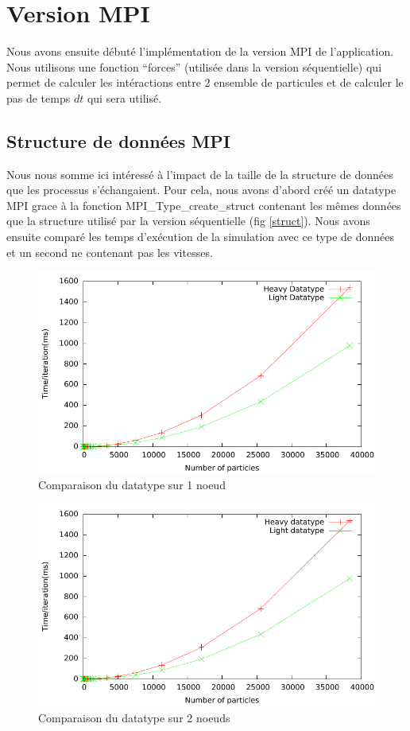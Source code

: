 \documentclass{article}
\begin{document}
\section{Version MPI}
Nous avons ensuite débuté l'implémentation de la version MPI de l'application. Nous utilisons une fonction ``forces'' (utilisée dans la version séquentielle) qui permet de calculer les intéractions entre 2 ensemble de particules et de calculer le pas de temps $ dt $ qui sera utilisé.

\subsection{Structure de données MPI}
Nous nous somme ici intéressé à l'impact de la taille de la structure de données que les processus s'échangaient. Pour cela, nous avons d'abord créé un datatype MPI grace à la fonction MPI\_Type\_create\_struct contenant les mêmes données que la structure utilisé par la version séquentielle (fig \ref{struct}). Nous avons ensuite comparé les temps d'exécution de la simulation avec ce type de données et un second ne contenant pas les vitesses.

\begin{figure}[!h]
  \centering
  \includegraphics[scale=0.7]{ResultTDP2/mpi_datatype/mpi_datatype_singlenode.pdf}
  \caption{\label{fig:tf(n)data1}Comparaison du datatype sur 1 noeud}
\end{figure}

\begin{figure}[!h]
  \centering
  \includegraphics[scale=0.7]{ResultTDP2/mpi_datatype/mpi_datatype_multinode.pdf}
  \caption{\label{fig:tf(n)data2}Comparaison du datatype sur 2 noeuds}
\end{figure}
\end{document}
